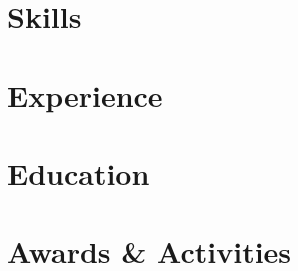 \documentclass[letter,10pt]{article}
\begin{document}
% 

\section{Skills}


\section{Experience}


\section{Education}



\section{Awards \& Activities}

\end{document}
